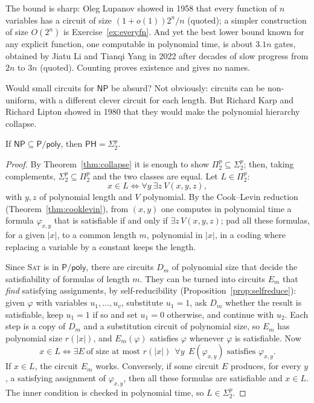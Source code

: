 The bound is sharp: Oleg Lupanov showed in 1958 that every function of $n$ variables has a circuit of size $(1+o(1))2^n/n$ (quoted); a simpler construction of size $O(2^n)$ is Exercise~\ref{ex:everyfn}. And yet the best lower bound known for any explicit function, one computable in polynomial time, is about $3.1n$ gates, obtained by Jiatu Li and Tianqi Yang in 2022 after decades of slow progress from $2n$ to $3n$ (quoted). Counting proves existence and gives no names.

\medskip
Would small circuits for $\mathsf{NP}$ be absurd? Not obviously: circuits can be non-uniform, with a different clever circuit for each length. But Richard Karp and Richard Lipton showed in 1980 that they would make the polynomial hierarchy collapse.

\begin{theorem}\label{thm:karplipton}
If $\mathsf{NP}\subseteq\mathsf P/\mathsf{poly}$, then $\mathsf{PH}=\Sigma_2^p$.
\end{theorem}

\begin{proof}
By Theorem~\ref{thm:collapse} it is enough to show $\Pi_2^p\subseteq\Sigma_2^p$; then, taking complements, $\Sigma_2^p\subseteq\Pi_2^p$ and the two classes are equal. Let $L\in\Pi_2^p$:
\[
x\in L\iff\forall y\ \exists z\ V(x,y,z),
\]
with $y,z$ of polynomial length and $V$ polynomial. By the Cook--Levin reduction (Theorem~\ref{thm:cooklevin}), from $(x,y)$ one computes in polynomial time a formula $\varphi_{x,y}$ that is satisfiable if and only if $\exists z\,V(x,y,z)$; pad all these formulas, for a given $|x|$, to a common length $m$, polynomial in $|x|$, in a coding where replacing a variable by a constant keeps the length.

Since \textup{\textsc{Sat}} is in $\mathsf P/\mathsf{poly}$, there are circuits $D_m$ of polynomial size that decide the satisfiability of formulas of length $m$. They can be turned into circuits $E_m$ that \emph{find} satisfying assignments, by self-reducibility (Proposition~\ref{prop:selfreduce}): given $\varphi$ with variables $u_1,\dots,u_v$, substitute $u_1=1$, ask $D_m$ whether the result is satisfiable, keep $u_1=1$ if so and set $u_1=0$ otherwise, and continue with $u_2$. Each step is a copy of $D_m$ and a substitution circuit of polynomial size, so $E_m$ has polynomial size $r(|x|)$, and $E_m(\varphi)$ satisfies $\varphi$ whenever $\varphi$ is satisfiable. Now
\[
x\in L\iff\exists E\ \text{of size at most }r(|x|)\ \ \forall y\ \ E(\varphi_{x,y})\text{ satisfies }\varphi_{x,y}.
\]
If $x\in L$, the circuit $E_m$ works. Conversely, if some circuit $E$ produces, for every $y$, a satisfying assignment of $\varphi_{x,y}$, then all these formulas are satisfiable and $x\in L$. The inner condition is checked in polynomial time, so $L\in\Sigma_2^p$.
\end{proof}

